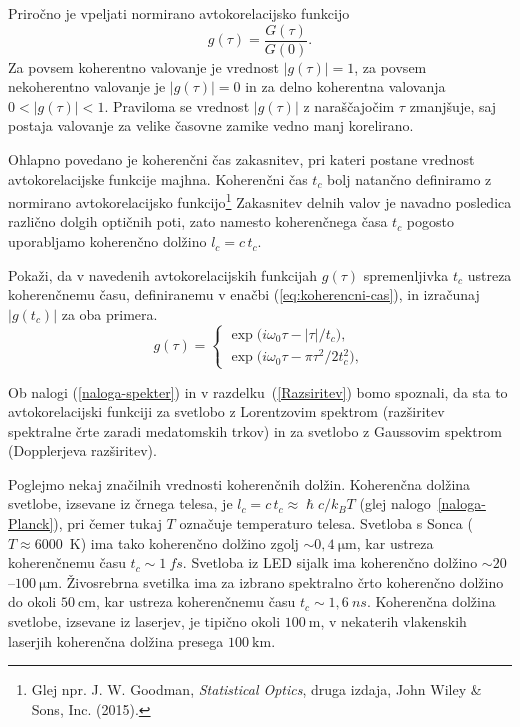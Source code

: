 Priročno je vpeljati normirano avtokorelacijsko funkcijo 
\begin{equation}
g(\tau)=\frac{G(\tau)}{G(0)}.
\label{eq:avtokorelacija-norm}
\end{equation}
Za povsem koherentno valovanje je vrednost $|g(\tau)|=1$, za povsem nekoherentno
valovanje je $|g(\tau)|=0$ in za delno koherentna valovanja $0<|g(\tau)|<1$.
Praviloma se vrednost $|g(\tau)|$ z naraščajočim $\tau$ zmanjšuje,
saj postaja valovanje za velike časovne zamike vedno manj korelirano.

Ohlapno povedano je koherenčni čas zakasnitev, pri kateri postane
vrednost avtokorelacijske funkcije majhna.
Koherenčni čas $t_{c}$ bolj natančno definiramo 
z normirano avtokorelacijsko funkcijo\footnote{Glej npr. J. W. Goodman, {\it Statistical Optics}, druga izdaja, 
John Wiley \& Sons, Inc. (2015).}
Zakasnitev delnih valov je navadno posledica
različno dolgih optičnih poti, zato namesto koherenčnega časa $t_c$
pogosto uporabljamo koherenčno dolžino $l_{c}=c\,t_{c}$. 
\newpage

\begin{naloga}
Pokaži, da v navedenih avtokorelacijskih
funkcijah $g(\tau)$ spremenljivka $t_{c}$ ustreza koherenčnemu času,
definiranemu v enačbi (\ref{eq:koherencni-cas}), in izračunaj $|g(t_{c})|$ za oba primera.
\begin{equation}
g(\tau)=\begin{cases}
\exp\big(i\omega_{0}\tau-\left|\tau\right|/t_{c}\big),\\
\exp\big(i\omega_{0}\tau-\pi\tau^{2}/2t_{c}^{2}\big),
\end{cases}
\label{eq:gauss-eksponent}
\end{equation}

Ob nalogi (\ref{naloga-spekter}) in v razdelku~(\ref{Razsiritev}) 
bomo spoznali, da sta to avtokorelacijski
funkciji za svetlobo z Lorentzovim spektrom
(razširitev spektralne črte zaradi medatomskih trkov) in za 
svetlobo z Gaussovim spektrom
(Dopplerjeva razširitev).
\end{naloga}

Poglejmo nekaj značilnih vrednosti koherenčnih dolžin. 
Koherenčna dolžina svetlobe, izsevane iz črnega telesa, je 
$l_{c}=c\,t_{c}\approx \hslash c/k_{B}T$ (glej nalogo~\ref{naloga-Planck}), pri 
čemer tukaj $T$ označuje temperaturo telesa. 
Svetloba s Sonca ($T \approx 6000$~K)
ima tako koherenčno dolžino zgolj $\sim 0,4~\si{\micro\metre}$, kar ustreza
koherenčnemu času $t_c \sim 1~\si{fs}$. Svetloba
iz LED sijalk ima koherenčno dolžino $\sim20$--$100~\si{\micro\metre}$.
Živosrebrna svetilka ima za izbrano spektralno črto koherenčno dolžino
do okoli $50~\si{\centi\metre}$, kar ustreza koherenčnemu času $t_c \sim 1,6~\si{ns}$.
Koherenčna dolžina svetlobe, izsevane iz laserjev, je tipično okoli $100~\si{\metre}$, 
v nekaterih vlakenskih laserjih koherenčna dolžina 
presega $100~\si{\kilo\metre}$.

